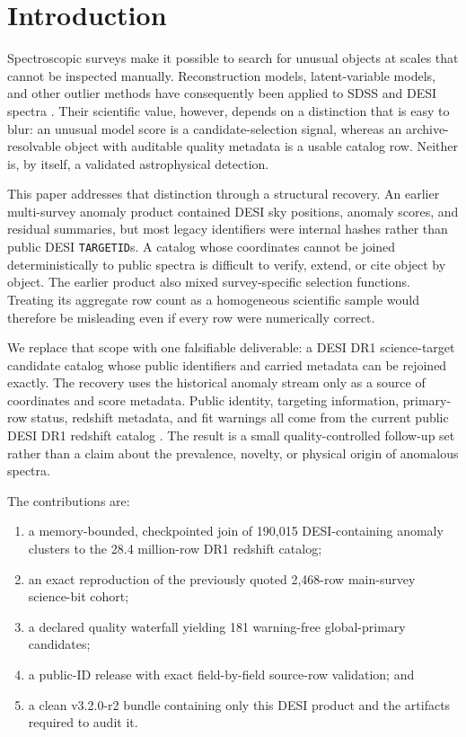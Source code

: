 \documentclass[twocolumn]{aastex701}
\newcommand{\releaseVersion}{v3.2.0-r2}
\begin{document}
\section{Introduction}\label{sec:introduction}

Spectroscopic surveys make it possible to search for unusual objects at scales that cannot be
inspected manually.  Reconstruction models, latent-variable models, and other outlier methods
have consequently been applied to SDSS and DESI spectra \citep{Baron2017,Liang2023,Nicolaou2026}.
Their scientific value, however, depends on a distinction that is easy to blur: an unusual model
score is a candidate-selection signal, whereas an archive-resolvable object with auditable
quality metadata is a usable catalog row.  Neither is, by itself, a validated astrophysical
detection.

This paper addresses that distinction through a structural recovery.  An earlier multi-survey
anomaly product contained DESI sky positions, anomaly scores, and residual summaries, but most
legacy identifiers were internal hashes rather than public DESI \texttt{TARGETID}s.  A catalog
whose coordinates cannot be joined deterministically to public spectra is difficult to verify,
extend, or cite object by object.  The earlier product also mixed survey-specific selection
functions.  Treating its aggregate row count as a homogeneous scientific sample would therefore
be misleading even if every row were numerically correct.

We replace that scope with one falsifiable deliverable: a DESI DR1 science-target candidate
catalog whose public identifiers and carried metadata can be rejoined exactly.  The recovery
uses the historical anomaly stream only as a source of coordinates and score metadata.  Public
identity, targeting information, primary-row status, redshift metadata, and fit warnings all
come from the current public DESI DR1 redshift catalog \citep{DESI2025DR1}.  The result is a small
quality-controlled follow-up set rather than a claim about the prevalence, novelty, or physical
origin of anomalous spectra.

The contributions are:
\begin{enumerate}
\item a memory-bounded, checkpointed join of 190,015 DESI-containing anomaly clusters to the
28.4 million-row DR1 redshift catalog;
\item an exact reproduction of the previously quoted 2,468-row main-survey science-bit cohort;
\item a declared quality waterfall yielding 181 warning-free global-primary candidates;
\item a public-ID release with exact field-by-field source-row validation; and
\item a clean \releaseVersion{} bundle containing only this DESI product and the artifacts required to audit it.
\end{enumerate}
\end{document}
